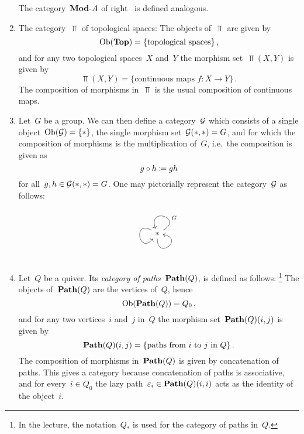 \begin{example}
\begin{enumerate}
      The category~$\text{$\mathbf{Mod}$-$A$}$ of right~{} is defined analogous.
    \item
      The category~$\Top$ of topological spaces:
      The objects of~$\Top$ are given by
      \[
          \operatorname{Ob}(\mathbf{Top})
        = \{
            \text{topological spaces}
          \} \,,
      \]
      and for any two topological spaces~$X$ and~$Y$ the morphism set~$\Top(X,Y)$ is given by
      \[
          \Top(X,Y)
        = \{
            \text{continuous maps~$f \colon X \to Y$}
          \} \,.
      \]
      The composition of morphisms in~$\Top$ is the usual composition of continuous maps.
    \item
      Let~$G$ be a group.
      We can then define a category~$\mathcal{G}$ which consists of a single object~$\operatorname{Ob}(\mathcal{G}) = \{ \ast \}$, the single morphism set~$\mathcal{G}(\ast,\ast) = G$, and for which the composition of morphisms is the multiplication of~$G$, i.e.\ the composition is given as
      \[
                  g \circ h
        \coloneqq  gh
      \]
      for all~$g, h \in \mathcal{G}(\ast,\ast) = G$.
      One may pictorially represent the category~$\mathcal{G}$ as follows:
      \[
        \begin{tikzcd}
          \ast
          \arrow[out=30,in=110,loop]{}[above right, near start]{G}
          \arrow[out=150,in=230,loop,looseness=6.5]
          \arrow[out=270,in=350,loop]
        \end{tikzcd}
      \]
    \item
      Let~$Q$ be a quiver.
      Its \emph{category of paths}~$\mathbf{Path}(Q)$, is defined as follows:%
      \footnote{In the lecture, the notation~$Q_*$ is used for the category of paths in~$Q$.}
      The objects of~$\mathbf{Path}(Q)$ are the vertices of~$Q$, hence
      \[
          \operatorname{Ob}(\mathbf{Path}(Q))
        = Q_0 \,,
      \]
      and for any two vertices~$i$ and~$j$ in~$Q$ the morphism set~$\mathbf{Path}(Q)(i,j)$ is given by
      \[
          \mathbf{Path}(Q)(i,j)
        = \{
            \text{paths from~$i$ to~$j$ in~$Q$}
          \} \,.
      \]
      The composition of morphisms in~$\mathbf{Path}(Q)$ is given by concatenation of paths.
      This gives a category because concatenation of paths is associative, and for every~$i \in Q_0$ the lazy path~$\varepsilon_i \in \mathbf{Path}(Q)(i,i)$ acts as the identity of the object~$i$.
  \end{enumerate}
\end{example}


